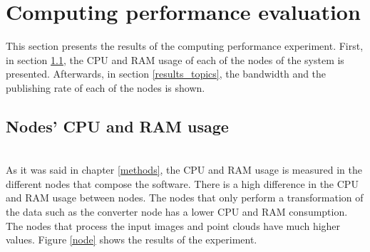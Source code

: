 \section{Computing performance evaluation}
This section presents the results of the computing performance experiment. 
First, in section \ref{results_nodes}, the CPU and RAM usage of each of the nodes of the system is presented. 
Afterwards, in section \ref{results_topics}, the bandwidth and the publishing rate of each of the nodes is shown. 
		\subsection{Nodes' CPU and RAM usage}
		\label{results_nodes}
		\\

			As it was said in chapter \ref{methods}, the CPU and RAM usage is measured in the different nodes that compose the software. 
			There is a high difference in the CPU and RAM usage between nodes.
			The nodes that only perform a transformation of the data such as the converter node has a lower CPU and RAM consumption.
			The nodes that process the input images and point clouds have much higher values. 
			Figure \ref{node} shows the results of the experiment. 


